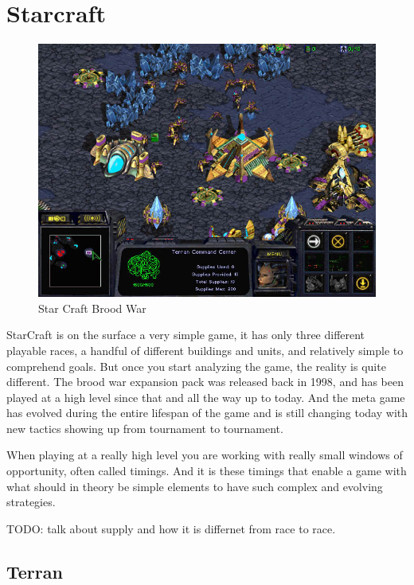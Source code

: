 
\section{Starcraft}

\begin{figure}[h!tb]
\centering
\includegraphics[scale=0.5]{graphics/scbw.jpg}
\caption{Star Craft Brood War}
\label{fig:scbwIntro}
\end{figure}

StarCraft is on the surface a very simple game, it has only three different playable races, a
handful of different buildings and units, and relatively simple to comprehend
goals. But once you start analyzing the game, the reality is quite different. The brood war expansion pack was released back in 1998, and has been played at a high level since that and all the way up to today. And the meta game has evolved during the entire lifespan of the game and is still changing today with new tactics showing up from tournament to tournament.
\cite{blizzardstarcraft}

When playing at a really high level you are working with really small windows of opportunity, often called timings. And it is these timings that enable a game with what should in theory be simple elements to have such complex and evolving strategies.

TODO: talk about supply and how it is differnet from race to race. 

\subsection{Terran}

